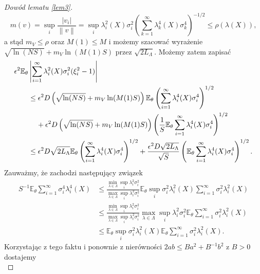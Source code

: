 \documentclass[man,mfiu]{mgrwms}
\newcommand{\norm}[1]{\left\lVert#1\right\rVert}
\begin{document}
\begin{proof}[Dowód lematu \ref{lem3}]
\begin{displaymath}
m(v)=\sup_i\frac{|v_i|}{\norm{v}}=\sup_i\lambda_i^2(X)\sigma_i^2\left(\sum_{k=1}^{\infty}\lambda_k^4(X)\sigma_k^4\right)^{-1/2}\leq \rho (\lambda(X)),
\end{displaymath}
a stąd $m_V\leq \rho$ oraz $M(1)\leq M$ i możemy szacować wyrażenie $\sqrt{\ln (NS)}+m_V\ln (M(1)S)$ przez $\sqrt{2L_{\Lambda}}$. Możemy zatem zapisać
\begin{displaymath}
\begin{split}
\epsilon^2\mathbb{E}_{\theta}&\left|\sum_{i=1}^{\infty}\lambda_i^2(X)\sigma_i^2(\xi^2_i-1)\right|\\
&\leq \epsilon^2D\left(\sqrt{\ln (NS)}+m_V\ln (M(1)S)\right)\mathbb{E}_{\theta}\left(\sum_{i=1}^{\infty}\lambda_i^4(X)\sigma_i^4\right)^{1/2}\\
&\hspace{4mm}+\epsilon^2D\left(\sqrt{\ln (NS)}+m_V\ln (M(1)S)\right)\left(\frac{1}{S}\mathbb{E}_{\theta}\sum_{i=1}^{\infty}\lambda_i^4(X)\sigma_i^4\right)^{1/2}\\
&\leq \epsilon^2D\sqrt{2L_{\Lambda}}\mathbb{E}_{\theta}\left(\sum_{i=1}^{\infty}\lambda_i^4(X)\sigma_i^4\right)^{1/2}+\frac{\epsilon^2D\sqrt{2L_{\Lambda}}}{\sqrt{S}}\left(\mathbb{E}_{\theta}\sum_{i=1}^{\infty}\lambda_i^4(X)\sigma_i^4\right)^{1/2}.
\end{split}
\end{displaymath}
Zauważmy, że zachodzi następujący związek
\begin{displaymath}
\begin{split}
S^{-1}\mathbb{E}_{\theta}\sum_{i=1}^{\infty}\sigma_i^4\lambda_i^4(X)&\leq \frac{\min_{\lambda\in \Lambda}\sup_i \lambda_i^2\sigma_i^2}{\max_{\lambda\in \Lambda}\sup_i \lambda_i^2\sigma_i^2}\mathbb{E}_{\theta}\sup_i\sigma_i^2\lambda_i^2(X)\sum_{i=1}^{\infty}\sigma_i^2\lambda_i^2(X)\\
&\leq \frac{\min_{\lambda\in \Lambda}\sup_i \lambda_i^2\sigma_i^2}{\max_{\lambda\in \Lambda}\sup_i \lambda_i^2\sigma_i^2}\max_{\lambda\in \Lambda}\sup_i \lambda_i^2\sigma_i^2\mathbb{E}_{\theta}\sum_{i=1}^{\infty}\sigma_i^2\lambda_i^2(X)\\
&\leq \mathbb{E}_{\theta}\sup_i\sigma_i^2\lambda_i^2(X)\mathbb{E}_{\theta}\sum_{i=1}^{\infty}\sigma_i^2\lambda_i^2(X).
\end{split}
\end{displaymath}
Korzystając z tego faktu i ponownie z nierówności $2ab\leq Ba^2+B^{-1}b^2$ z $B>0$ dostajemy
\begin{displaymath}

\end{displaymath}
\end{proof}
\end{document}

